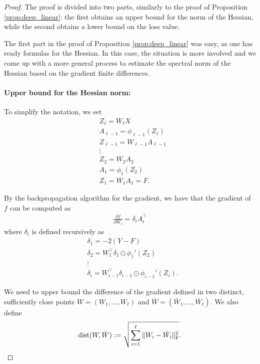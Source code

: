\documentclass[a4paper,11pt]{article}
\newcommand{\1}{\mathbbm{1}}
\theoremstyle{plain}
\begin{document}
\begin{proof}
The proof is divided into two parts, similarly to the proof of Proposition \ref{prop:deep_linear}: the first obtains an upper bound for the norm of the Hessian, while the second obtains a lower bound on the loss value.

The first part in the proof of Proposition \ref{prop:deep_linear} was easy, as one has ready formulas for the Hessian. In this case, the situation is more involved and we come up with a more general process to estimate the spectral norm of the Hessian based on the gradient finite differences.

\paragraph{Upper bound for the Hessian norm:}
To simplify the notation, we set
    \begin{align*}
        &Z_{\ell} = W_{\ell} X \\
        &A_{\ell-1} = \phi_{\ell-1} (Z_{\ell}) \\
        & Z_{\ell-1} = W_{\ell-1} A_{\ell-1} \\
        &\vdots 
        \\
        & Z_2 = W_2 A_2 \\ &
        A_1 = \phi_1(Z_2) \\ &
        Z_1 = W_1 A_1 = F.
    \end{align*}
    
    By the backpropagation algorithm for the gradient, we have that the gradient of $f$ can be computed as
    \begin{align*}
        \frac{\partial f}{\partial W_i} = \delta_i A_i^\top
    \end{align*}
    where $\delta_i$ is defined recursively as
    \begin{align*}
        &\delta_1 = -2(Y-F) \\ &
        \delta_2 = W_1^\top \delta_1 \odot \phi_1'(Z_2) \\ &
        \vdots \\ &
        \delta_i = W_{i-1}^\top \delta_{i-1} \odot \phi_{i-1}'(Z_i).
    \end{align*}

We need to upper bound the difference of the gradient defined in two distinct, sufficiently close points $W=(W_1,\dots,W_{\ell})$ and $\bar W = (\bar W_1,\dots, \bar W_{\ell})$. We also define
\begin{equation*}
    \textnormal{dist}(W, \bar W) := \sqrt{\sum_{i=1}^{\ell} \|W_i- \bar W_i\|^2_{\rm F}}.
\end{equation*}


\end{proof}
\end{document}
